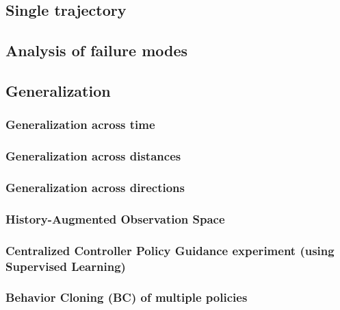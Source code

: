 \subsection{Single trajectory}

\subsection{Analysis of failure modes}

\subsection{Generalization}

\subsubsection{Generalization across time}

\subsubsection{Generalization across distances}

\subsubsection{Generalization across directions}

\subsubsection{History-Augmented Observation Space}

\subsubsection{Centralized Controller Policy Guidance experiment (using Supervised Learning)}

\subsubsection{Behavior Cloning (BC) of multiple policies}
